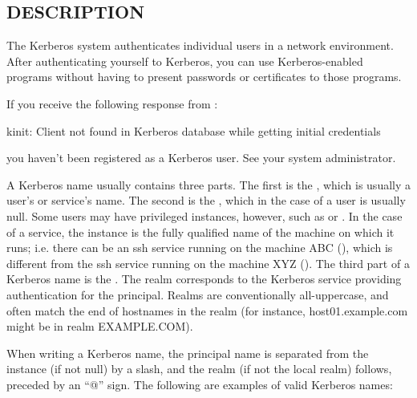 \documentclass[letterpaper,10pt,english]{sphinxmanual}
\begin{document}
\subsection{DESCRIPTION}
\label{\detokenize{user/user_config/kerberos:description}}
The Kerberos system authenticates individual users in a network
environment.  After authenticating yourself to Kerberos, you can use
Kerberos-enabled programs without having to present passwords or
certificates to those programs.

If you receive the following response from {\hyperref[\detokenize{user/user_commands/kinit:kinit-1}]{}}:

kinit: Client not found in Kerberos database while getting initial
credentials

you haven’t been registered as a Kerberos user.  See your system
administrator.

A Kerberos name usually contains three parts.  The first is the
, which is usually a user’s or service’s name.  The second
is the , which in the case of a user is usually null.
Some users may have privileged instances, however, such as  or
.  In the case of a service, the instance is the fully
qualified name of the machine on which it runs; i.e. there can be an
ssh service running on the machine ABC (), which is
different from the ssh service running on the machine XYZ
().  The third part of a Kerberos name is the .
The realm corresponds to the Kerberos service providing authentication
for the principal.  Realms are conventionally all-uppercase, and often
match the end of hostnames in the realm (for instance, host01.example.com
might be in realm EXAMPLE.COM).

When writing a Kerberos name, the principal name is separated from the
instance (if not null) by a slash, and the realm (if not the local
realm) follows, preceded by an “@” sign.  The following are examples
of valid Kerberos names:

%
\begin{sphinxVerbatim}[commandchars=\\\{\}]
\end{sphinxVerbatim}
\end{document}

